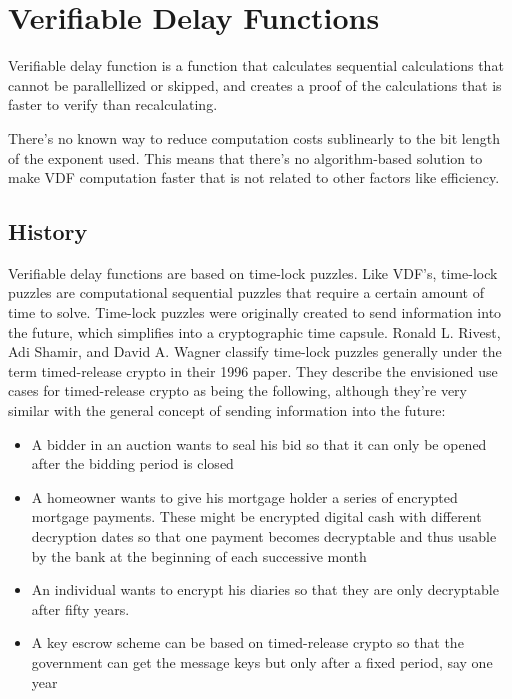 \chapter{Verifiable Delay Functions}
\label{Verifiable Delay Functions}

Verifiable delay function is a function that calculates sequential calculations that cannot be parallellized or skipped, and creates a proof of the calculations that is faster to verify than recalculating.

There's no known way to reduce computation costs sublinearly to the bit length of the exponent used.\cite{Boneh2018-sm} This means that there's no algorithm-based solution to make VDF computation faster that is not related to other factors like efficiency.

\section{History}
Verifiable delay functions are based on time-lock puzzles. Like VDF's, time-lock puzzles are computational sequential puzzles that require a certain amount of time to solve.\cite{Rivest_undated-qr} Time-lock puzzles were originally created to send information into the future, which simplifies into a cryptographic time capsule. Ronald L. Rivest, Adi Shamir, and David A. Wagner classify time-lock puzzles generally under the term timed-release crypto in their 1996 paper. They describe the envisioned use cases for timed-release crypto as being the following, although they're very similar with the general concept of sending information into the future:

\begin{itemize}
  \item A bidder in an auction wants to seal his bid so that it can only be opened after the bidding period is closed 
  \item A homeowner wants to give his mortgage holder a series of encrypted mortgage payments. These might be encrypted digital cash with different decryption dates so that one payment becomes decryptable and thus usable by the bank at the beginning of each successive month
  \item An individual wants to encrypt his diaries so that they are only decryptable after fifty years.
  \item A key escrow scheme can be based on timed-release crypto so that the government can get the message keys but only after a fixed period, say one year
\end{itemize}

